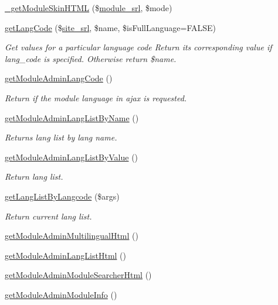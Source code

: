 \begin{DoxyCompactItemize}
\item 
\hyperlink{classmoduleAdminModel_ac69c4e024dcabbcaa3f7a13a4c61af04}{\-\_\-get\-Module\-Skin\-H\-T\-M\-L} (\$\hyperlink{ko_8install_8php_a370bb6450fab1da3e0ed9f484a38b761}{module\-\_\-srl}, \$mode)
\item 
\hyperlink{classmoduleAdminModel_aa10dc8b8645165816c43f140c57b546b}{get\-Lang\-Code} (\$\hyperlink{ko_8install_8php_a8b1406b4ad1048041558dce6bfe89004}{site\-\_\-srl}, \$name, \$is\-Full\-Language=F\-A\-L\-S\-E)
\begin{DoxyCompactList}\small\item\em Get values for a particular language code Return its corresponding value if lang\-\_\-code is specified. Otherwise return \$name. \end{DoxyCompactList}\item 
\hyperlink{classmoduleAdminModel_a783b7e9e5a0db68d0eb782fff6f7e461}{get\-Module\-Admin\-Lang\-Code} ()
\begin{DoxyCompactList}\small\item\em Return if the module language in ajax is requested. \end{DoxyCompactList}\item 
\hyperlink{classmoduleAdminModel_ab5982d758fb39c6d56c41af9827845cf}{get\-Module\-Admin\-Lang\-List\-By\-Name} ()
\begin{DoxyCompactList}\small\item\em Returns lang list by lang name. \end{DoxyCompactList}\item 
\hyperlink{classmoduleAdminModel_acd8e42367271f853d4da4388fe15b0d1}{get\-Module\-Admin\-Lang\-List\-By\-Value} ()
\begin{DoxyCompactList}\small\item\em Return lang list. \end{DoxyCompactList}\item 
\hyperlink{classmoduleAdminModel_a425b28af6d0f27c2306191d7a4abdbaa}{get\-Lang\-List\-By\-Langcode} (\$args)
\begin{DoxyCompactList}\small\item\em Return current lang list. \end{DoxyCompactList}\item 
\hyperlink{classmoduleAdminModel_a51568f16c761da74a811fe599970ea0f}{get\-Module\-Admin\-Multilingual\-Html} ()
\item 
\hyperlink{classmoduleAdminModel_a1f3f518448a54604d56032927b4ef957}{get\-Module\-Admin\-Lang\-List\-Html} ()
\item 
\hyperlink{classmoduleAdminModel_aca064d49155437d5cad912d1f885933f}{get\-Module\-Admin\-Module\-Searcher\-Html} ()
\item 
\hyperlink{classmoduleAdminModel_a205c97c3919ee573047431c8c2a0e1a7}{get\-Module\-Admin\-Module\-Info} ()
\end{DoxyCompactItemize}
